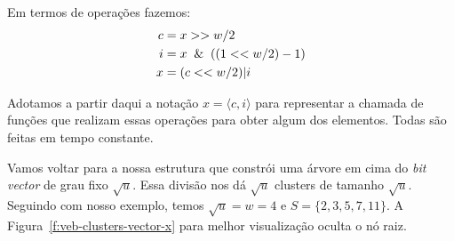 Em termos de operações fazemos:
\begin{align*}
c & = x >> w/2 \\
i & = x \And ((1 << w/2)-1) \\
x & = (c << w/2) | i
\end{align*}

Adotamos a partir daqui a notação $x=\langle c,i \rangle$ para representar a
chamada de funções que realizam essas operações para obter algum dos elementos.
Todas são feitas em tempo constante.                        

Vamos voltar para a nossa estrutura que constrói uma árvore em cima do
\textit{bit vector} de grau fixo $\sqrt u$. Essa divisão nos dá $\sqrt u$
clusters de tamanho $\sqrt u$. Seguindo com nosso exemplo, temos $\sqrt u = w =
4$ e $S=\{2,3,5,7,11\}$. A Figura~\ref{f:veb-clusters-vector-x} para melhor
visualização oculta o nó raiz.

